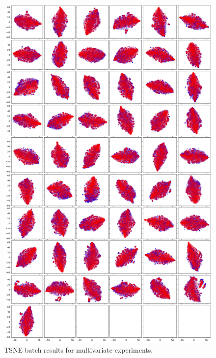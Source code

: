 \begin{figure}
    \centering
    \includegraphics[height=\textheight]{images/tsen_overall_mult.png}
    \caption{TSNE batch results for multivariate experiments.}
    \label{fig:tsne overall mult}
\end{figure}

